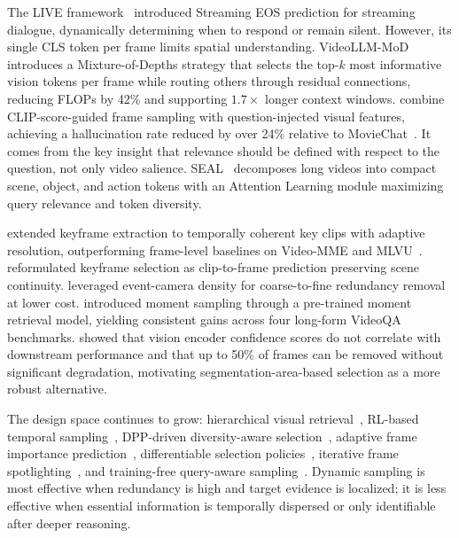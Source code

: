 \documentclass[10pt]{article} %
\begin{document}
The LIVE framework~\citep{Chen2024VideoLLMonlineOV} introduced Streaming EOS prediction for streaming dialogue, dynamically determining when to respond or remain silent. However, its single CLS token per frame limits spatial understanding. VideoLLM-MoD~\citep{Wu2024VideoLLMMoDEV} introduces a Mixture-of-Depths strategy that selects the top-$k$ most informative vision tokens per frame while routing others through residual connections, reducing FLOPs by 42\% and supporting $1.7\times$ longer context windows. \citet{Sun2024HallucinationMP} combine CLIP-score-guided frame sampling with question-injected visual features, achieving a hallucination rate reduced by over 24\% relative to MovieChat~\citep{Song2023MovieChatFD}. It comes from the key insight that relevance should be defined with respect to the question, not only video salience. SEAL~\citep{Wang2024SEALSA} decomposes long videos into compact scene, object, and action tokens with an Attention Learning module maximizing query relevance and token diversity.

\citet{Sun2025FromFT} extended keyframe extraction to temporally coherent key clips with adaptive resolution, outperforming frame-level baselines on Video-MME and MLVU~\citep{zhou2025mlvu}. \citet{Yao2025KframesSA} reformulated keyframe selection as clip-to-frame prediction preserving scene continuity. \citet{Xu2025EventSTUEE} leveraged event-camera density for coarse-to-fine redundancy removal at lower cost. \citet{Chasmai2025MomentSI} introduced moment sampling through a pre-trained moment retrieval model, yielding consistent gains across four long-form VideoQA benchmarks. \citet{Ok2025DoVL} showed that vision encoder confidence scores do not correlate with downstream performance and that up to 50\% of frames can be removed without significant degradation, motivating segmentation-area-based selection as a more robust alternative.

The design space continues to grow: hierarchical visual retrieval~\citep{Gao2025APVRHL}, RL-based temporal sampling~\citep{Tang2025TSPOTS}, DPP-driven diversity-aware selection~\citep{Wang2025LASTLT}, adaptive frame importance prediction~\citep{Li2025FrameOracleLW}, differentiable selection policies~\citep{Buch2025FlexibleFS}, iterative frame spotlighting~\citep{He2025FrameThinkerLT}, and training-free query-aware sampling~\citep{Liu2025BOLTBL}. Dynamic sampling is most effective when redundancy is high and target evidence is localized; it is less effective when essential information is temporally dispersed or only identifiable after deeper reasoning. %
\end{document}
